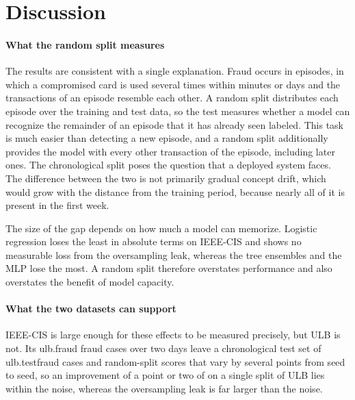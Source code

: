 \section{Discussion}
\label{sec:discussion}

\paragraph{What the random split measures}
The results are consistent with a single explanation. Fraud occurs in episodes, in which a compromised card is used several times within minutes or days and the transactions of an episode resemble each other. A random split distributes each episode over the training and test data, so the test measures whether a model can recognize the remainder of an episode that it has already seen labeled. This task is much easier than detecting a new episode, and a random split additionally provides the model with every other transaction of the episode, including later ones. The chronological split poses the question that a deployed system faces. The difference between the two is not primarily gradual concept drift, which would grow with the distance from the training period, because nearly all of it is present in the first week.

The size of the gap depends on how much a model can memorize. Logistic regression loses the least in absolute terms on IEEE-CIS and shows no measurable loss from the oversampling leak, whereas the tree ensembles and the MLP lose the most. A random split therefore overstates performance and also overstates the benefit of model capacity.

\paragraph{What the two datasets can support}
IEEE-CIS is large enough for these effects to be measured precisely, but ULB is not. Its \num{ulb.fraud} fraud cases over two days leave a chronological test set of \num{ulb.testfraud} cases and random-split scores that vary by several points from seed to seed, so an improvement of a point or two of \prauc{} on a single split of ULB lies within the noise, whereas the oversampling leak is far larger than the noise.

